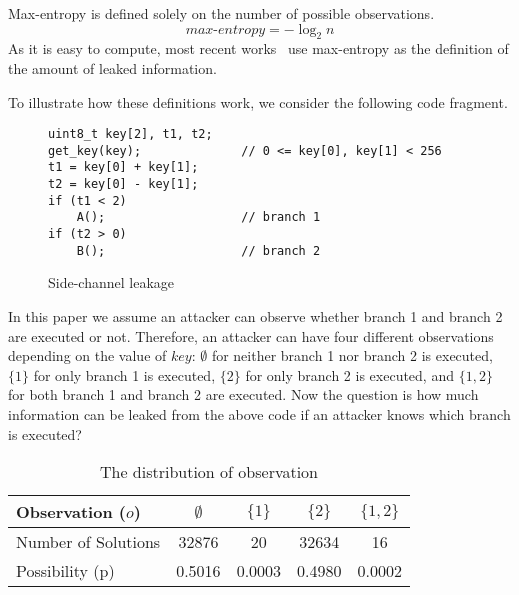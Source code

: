 Max-entropy is defined solely on the number of possible observations.
\begin{displaymath}
    \mathit{max\text{-}entropy} = -\log_2{n}
\end{displaymath}
As it is easy to compute, most recent works~\cite{182946,Doychev:2017:RAS:3062341.3062388} use max-entropy as the definition of
the amount of leaked information.

To illustrate how these definitions work, we consider the following code
fragment.

\begin{figure}[h!]
\centering
\begin{lstlisting}[xleftmargin=.03\textwidth,xrightmargin=.01\textwidth]
uint8_t key[2], t1, t2;
get_key(key);              // 0 <= key[0], key[1] < 256
t1 = key[0] + key[1];
t2 = key[0] - key[1];
if (t1 < 2) 
    A();                   // branch 1
if (t2 > 0)                
    B();                   // branch 2
\end{lstlisting}
\vspace*{-9pt}
    \caption{Side-channel leakage}
    \label{fig:side-channel}
\end{figure}
In this paper we assume an attacker can observe whether branch 1 and branch 2 are
executed or not. Therefore, an attacker can have four different observations
depending on the value of $\mathit{key}$: $\emptyset$ for neither branch 1 nor
branch 2 is executed, $\{1\}$ for only branch 1 is executed, $\{2\}$ for only branch 2 is
executed, and $\{1, 2\}$ for both branch 1 and branch 2 are executed. Now the
question is how much information can be leaked from the above code if an
attacker knows which branch is executed?

\begin{table}[ht]
    \centering\small\footnotesize
    \caption{The distribution of observation}\label{shtable}
    \vspace*{-0pt}
    \begin{tabular}{l|cccc}
        \hline
        Observation ($o$)   & $\emptyset$ & ${\{1\}}$ & ${\{2\}}$ & ${\{1, 2\}}$ \\ \hline
        Number of Solutions & 32876       & 20        & 32634     & 16           \\ \hline
        Possibility (p)     & 0.5016      & 0.0003    & 0.4980    & 0.0002       \\
        \hline
    \end{tabular}
\end{table}


